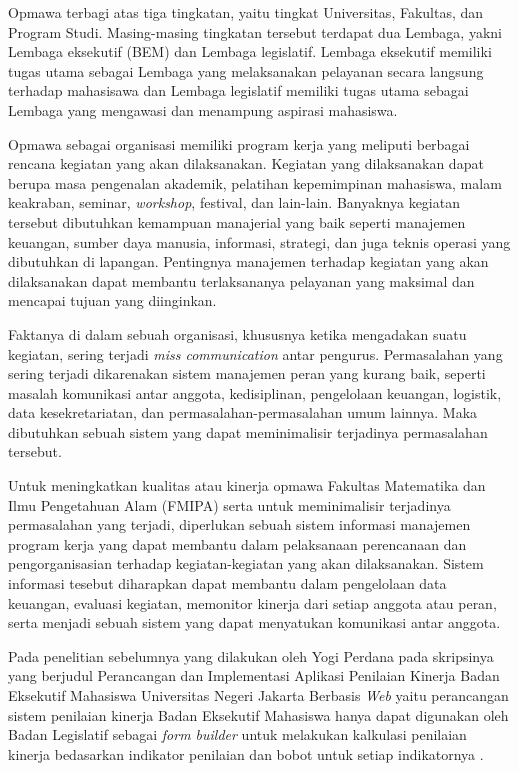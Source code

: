 Opmawa terbagi atas tiga tingkatan, yaitu tingkat Universitas, Fakultas, dan Program Studi. Masing-masing tingkatan tersebut terdapat dua Lembaga, yakni Lembaga eksekutif (BEM) dan Lembaga legislatif. Lembaga eksekutif memiliki tugas utama sebagai Lembaga yang melaksanakan pelayanan secara langsung terhadap mahasisawa dan Lembaga legislatif memiliki tugas utama sebagai Lembaga yang mengawasi dan menampung aspirasi mahasiswa. 

Opmawa sebagai organisasi memiliki program kerja yang meliputi berbagai rencana kegiatan yang akan dilaksanakan. Kegiatan yang dilaksanakan dapat berupa masa pengenalan akademik, pelatihan kepemimpinan mahasiswa, malam keakraban, seminar, \emph{workshop}, festival, dan lain-lain. Banyaknya kegiatan tersebut dibutuhkan kemampuan manajerial yang baik seperti manajemen keuangan, sumber daya manusia, informasi, strategi, dan juga teknis operasi yang dibutuhkan di lapangan. Pentingnya manajemen terhadap kegiatan yang akan dilaksanakan dapat membantu terlaksananya pelayanan yang maksimal dan mencapai tujuan yang diinginkan.

Faktanya di dalam sebuah organisasi, khususnya ketika mengadakan suatu kegiatan, sering terjadi \emph{miss communication} antar pengurus. Permasalahan yang sering terjadi dikarenakan sistem manajemen peran yang kurang baik, seperti masalah komunikasi antar anggota, kedisiplinan, pengelolaan keuangan, logistik, data kesekretariatan, dan permasalahan-permasalahan umum lainnya. Maka dibutuhkan sebuah sistem yang dapat meminimalisir terjadinya permasalahan tersebut.

Untuk meningkatkan kualitas atau kinerja opmawa Fakultas Matematika dan Ilmu Pengetahuan Alam (FMIPA) serta untuk meminimalisir terjadinya permasalahan yang terjadi, diperlukan sebuah sistem informasi manajemen program kerja yang dapat membantu dalam pelaksanaan perencanaan dan pengorganisasian terhadap kegiatan-kegiatan yang akan dilaksanakan. Sistem informasi tesebut diharapkan dapat membantu dalam pengelolaan data keuangan, evaluasi kegiatan, memonitor kinerja dari setiap anggota atau peran, serta menjadi sebuah sistem yang dapat menyatukan komunikasi antar anggota.

Pada penelitian sebelumnya yang dilakukan oleh Yogi Perdana pada skripsinya yang berjudul Perancangan dan Implementasi Aplikasi Penilaian Kinerja Badan Eksekutif Mahasiswa Universitas Negeri Jakarta Berbasis \textit{Web} yaitu perancangan sistem penilaian kinerja Badan Eksekutif Mahasiswa hanya dapat digunakan oleh Badan Legislatif sebagai \textit{form builder} untuk melakukan kalkulasi penilaian kinerja bedasarkan indikator penilaian dan bobot untuk setiap indikatornya \cite{perdana}. 

